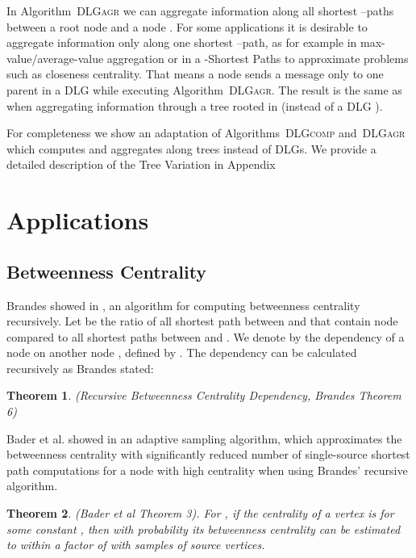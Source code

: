 \documentclass[11pt]{article}
\newtheorem{theorem}{Theorem}[section]
\newcommand{\todoI}[1]{}\newcommand{\blueI}[1]{}
\newif\iffull
\newif\ifshort
\begin{document}
In Algorithm\iffull~\ref{alg:DLGagr}\fi~\textsc{DLGagr} we can aggregate information along all shortest --paths between a root node  and a node .
For some applications it is desirable to aggregate information only along one shortest --path, as for example in max-value/average-value aggregation or in a  -Shortest Paths to approximate problems such as closeness centrality.
That means a node  sends a message only to one parent in a DLG  while executing Algorithm\iffull~\ref{alg:DLGagr}\fi~\textsc{DLGagr}.
The result is the same as when aggregating information through a tree  rooted in  (instead of a DLG ).
\todoI{Can be done inside aggregation fkt?}
For completeness we show an adaptation of Algorithms\iffull~\ref{alg:DLGcomp}\fi~\textsc{DLGcomp} and\iffull~\ref{alg:DLGagr}\fi~\textsc{DLGagr} which computes and aggregates along trees instead of DLGs.
We provide a detailed description of the Tree Variation in Appendix 
\ifshort
\ref{FULL:app:tree}.
\fi
\iffull
\ref{app:tree}.
\fi







\section{Applications}

\subsection{Betweenness Centrality}
\label{sec:BC}

Brandes showed in \cite{brandes:2001:fasterBCalgo}, an algorithm for computing betweenness centrality recursively. Let  be the ratio of all shortest path between  and  that contain node  compared to all shortest paths between  and . We denote by  \todoI{how does it relate to BC?}the dependency of a node  on another node , defined by . The dependency can be calculated recursively as Brandes  \cite{brandes:2001:fasterBCalgo} stated:

\begin{theorem} (Recursive Betweenness Centrality Dependency, Brandes \cite{brandes:2001:fasterBCalgo} Theorem 6)

\label{theo:brandes:recursive}
\end{theorem}

Bader et al. showed in \cite{bader:2007:BCapprox} an adaptive sampling algorithm, which approximates the betweenness centrality with significantly reduced number of single-source shortest path computations for a node with high centrality when using Brandes' recursive algorithm.
\begin{theorem} (Bader et al \cite{bader:2007:BCapprox} Theorem 3).
For , if the centrality of a vertex  is  for some constant\todoI{constant ???} , then with probability  its betweenness centrality can be estimated to within a factor of  with  samples of source vertices.
\label{theo:bader:estimation}
\end{theorem}
\end{document}
